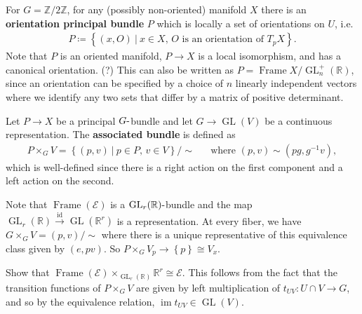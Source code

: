 \begin{example}

For \(G={\mathbb{Z}}/2{\mathbb{Z}}\), for any (possibly non-oriented)
manifold \(X\) there is an \textbf{orientation principal bundle} \(P\)
which is locally a set of orientations on \(U\), i.e.~
\begin{align*}
P\coloneqq\left\{{(x, O) {~\mathrel{\Big|}~}x\in X,\, O \text{ is an orientation of }T_p X}\right\}
.\end{align*}
Note that \(P\) is an oriented manifold, \(P\to X\) is a local
isomorphism, and has a canonical orientation. (?) This can also be
written as
\(P = {\operatorname{Frame}}X / \operatorname{GL}_n^+({\mathbb{R}})\),
since an orientation can be specified by a choice of \(n\) linearly
independent vectors where we identify any two sets that differ by a
matrix of positive determinant.

\end{example}

\begin{definition}

Let \(P\to X\) be a principal \(G{\hbox{-}}\)bundle and let
\(G\to \operatorname{GL}(V)\) be a continuous representation. The
\textbf{associated bundle} is defined as
\begin{align*}
P\times_G V = \left\{{(p, v){~\mathrel{\Big|}~}p\in P,\, v\in V}\right\} / \sim && \text{where } (p, v) \sim (pg, g ^{-1} v)
,\end{align*}
which is well-defined since there is a right action on the first
component and a left action on the second.

\end{definition}

\begin{example}[?]

Note that \({\operatorname{Frame}}(\mathcal{E})\) is a
\(\operatorname{GL}_r({\mathbb{R}}){\hbox{-}}\)bundle and the map
\(\operatorname{GL}_r({\mathbb{R}}) \xrightarrow{\operatorname{id}} \operatorname{GL}({\mathbb{R}}^r)\)
is a representation. At every fiber, we have
\(G \times_G V = (p, v)/\sim\) where there is a unique representative of
this equivalence class given by \((e, pv)\). So
\(P\times_G V_p \to \left\{{p}\right\} \cong V_x\).

\begin{exercise}[?]

Show that
\({\operatorname{Frame}}( \mathcal{E}) \times_{\operatorname{GL}_r({\mathbb{R}})} {\mathbb{R}}^r \cong \mathcal{E}\).
This follows from the fact that the transition functions of
\(P \times_G V\) are given by left multiplication of
\(t_{UV}: U \cap V \to G\), and so by the equivalence relation,
\(\operatorname{im}t_{UV} \in \operatorname{GL}(V)\).

\end{exercise}

\end{example}

